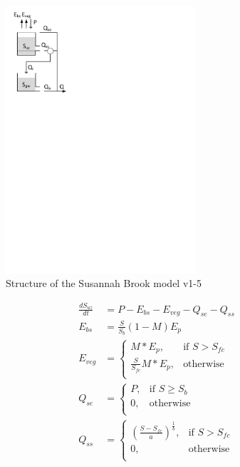 { 																	%
\begin{figure}
\includegraphics[trim=1cm 20cm 10cm 1cm,width=7cm,keepaspectratio]{./files/09_schematic.pdf}
\caption{Structure of the Susannah Brook model v1-5} \label{fig:09_schematic}
\end{figure}

\begin{align}
	\frac{dS_{uz}}{dt} &= P-E_{bs}-E_{veg}-Q_{se}-Q_{ss}\\
	E_{bs} &= \frac{S}{S_b}\left(1-M\right)E_p\\
	E_{veg} &= \begin{cases}
		M*E_p, &\text{if } S >S_{fc}\\
		\frac{S}{S_{fc}}M*E_p, &\text{otherwise}\\
	\end{cases}\\
	Q_{se} &= \begin{cases}
		P, &\text{if } S \geq S_b\\
		0, &\text{otherwise}\\
	\end{cases}\\
	Q_{ss} &= \begin{cases}
		\left(\frac{S-S_{fc}}{a}\right)^{\frac{1}{b}}, &\text{if } S > S_{fc}\\
		0, &\text{otherwise}\\
	\end{cases}
\end{align}

\vspace{2cm}
}

